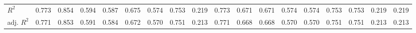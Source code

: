\begin{table}[htbp]
\begin{tabular}{l*{17}{c}}
\(R^{2}\)   &       0.773         &       0.854         &       0.594         &       0.587         &       0.675         &       0.574         &       0.753         &       0.219         &       0.773         &       0.671         &       0.671         &       0.574         &       0.574         &       0.753         &       0.753         &       0.219         &       0.219         \\
adj. \(R^{2}\)&       0.771         &       0.853         &       0.591         &       0.584         &       0.672         &       0.570         &       0.751         &       0.213         &       0.771         &       0.668         &       0.668         &       0.570         &       0.570         &       0.751         &       0.751         &       0.213         &       0.213         \\
\hline\hline
\end{tabular}
\end{table}
